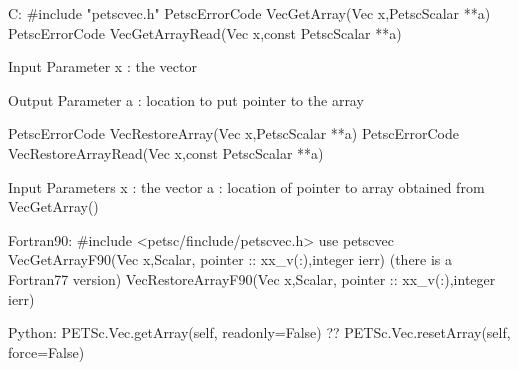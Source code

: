C:
#include "petscvec.h"
PetscErrorCode VecGetArray(Vec x,PetscScalar **a)
PetscErrorCode VecGetArrayRead(Vec x,const PetscScalar **a)

Input Parameter
x : the vector

Output Parameter
a : location to put pointer to the array

PetscErrorCode VecRestoreArray(Vec x,PetscScalar **a)
PetscErrorCode VecRestoreArrayRead(Vec x,const PetscScalar **a)

Input Parameters
x : the vector
a : location of pointer to array obtained from VecGetArray()

Fortran90:
#include <petsc/finclude/petscvec.h>
use petscvec
VecGetArrayF90(Vec x,{Scalar, pointer :: xx_v(:)},integer ierr)
(there is a Fortran77 version)
VecRestoreArrayF90(Vec x,{Scalar, pointer :: xx_v(:)},integer ierr)

Python:
PETSc.Vec.getArray(self, readonly=False)
?? PETSc.Vec.resetArray(self, force=False)
